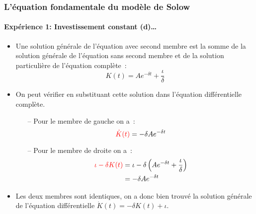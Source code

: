 \documentclass[10pt,notheorems]{beamer}
\theoremstyle{plain}
\theoremstyle{definition} %
\begin{document}
\begin{frame}
  \frametitle{L'équation fondamentale du modèle de Solow}
  \framesubtitle{Expérience 1: Investissement constant (d)\ldots}

  \bigskip

  \begin{itemize}

  \item Une solution générale de l'équation avec second membre est la somme de la solution générale de l'équation sans second membre et de la solution particulière de l'équation complète~:
    \[
      K(t) = Ae^{-\delta t} + \frac{\iota}{\delta}
    \]

  \item On peut vérifier en substituant cette solution dans l'équation différentielle complète.
    \begin{itemize}
    \item[--] Pour le membre de gauche on a~:
      \[
        {\color{red}\dot K(t)} = -\delta A e^{-\delta t}
      \]
    \item[--] Pour le membre de droite on a~:
      \[
        \begin{split}
          {\color{red}\iota - \delta K(t)} &= \iota - \delta \left(Ae^{-\delta t} + \frac{\iota}{\delta}\right)\\
          &= -\delta A e^{-\delta t}
        \end{split}
      \]
    \end{itemize}
  \item Les deux membres sont identiques, on a donc bien trouvé la solution générale de l'équation différentielle $\dot K(t) = -\delta K(t) + \iota$.
  \end{itemize}

\end{frame}
\end{document}
